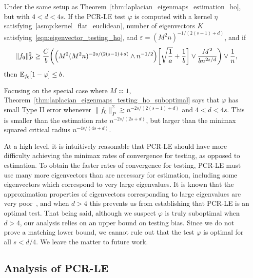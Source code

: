 \begin{theorem}
	\label{thm:laplacian_eigenmaps_testing_ho_suboptimal}
	Under the same setup as Theorem~\ref{thm:laplacian_eigenmaps_estimation_ho}, but with $4 < d < 4s$. If the PCR-LE test $\varphi$ is computed with a kernel $\eta$ satisfying~\ref{asmp:kernel_flat_euclidean}, number of eigenvectors $K$ satisfying~\eqref{eqn:eigenvector_testing_ho}, and $\varepsilon = (M^2n)^{-1/(2(s - 1) + d)}$, and if 
	\begin{equation}
	\label{eqn:laplacian_eigenmaps_testing_criticalradius_ho_suboptimal}
	\|f_0\|_P^2 \geq \frac{C}{b}\biggl(\Bigl(M^2(M^2n)^{-2s/(2(s - 1) + d) } \wedge n^{-1/2}\Bigr)\biggl[\sqrt{\frac{1}{a}} + \frac{1}{b}\biggr] \vee \frac{M^2}{b n^{2s/d}} \biggr) \vee \frac{1}{n},
	\end{equation}
	then $\mathbb{E}_{f_0}[1 - \varphi] \leq b$.
\end{theorem}
Focusing on the special case where $M \asymp 1$, Theorem~\ref{thm:laplacian_eigenmaps_testing_ho_suboptimal} says that $\varphi$ has small Type II error whenever $\|f_0\|_P^2 \gtrsim n^{-2s/(2(s - 1) + d)}$ and $4 < d < 4s$. This is smaller than the estimation rate $n^{-2s/(2s + d)}$, but larger than the minimax squared critical radius $n^{-4s/(4s + d)}$. 

At a high level, it is intuitively reasonable that PCR-LE should have more difficulty achieving the minimax rates of convergence for testing, as opposed to estimation. To obtain the faster rates of convergence for testing, PCR-LE must use many more eigenvectors than are necessary for estimation, including some eigenvectors which correspond to very large eigenvalues. It is known that the approximation properties of eigenvectors corresponding to large eigenvalues are very poor~\citep{burago2014,trillos2019}, and when $d > 4$ this prevents us from establishing that PCR-LE is an optimal test. That being said, although we suspect $\varphi$ is truly suboptimal when $d > 4$, our analysis relies on an upper bound on testing bias. Since we do not prove a matching lower bound, we cannot rule out that the test $\varphi$ is optimal for all $s < d/4$. We leave the matter to future work.

\subsection{Analysis of PCR-LE}
\label{subsec:analysis}

